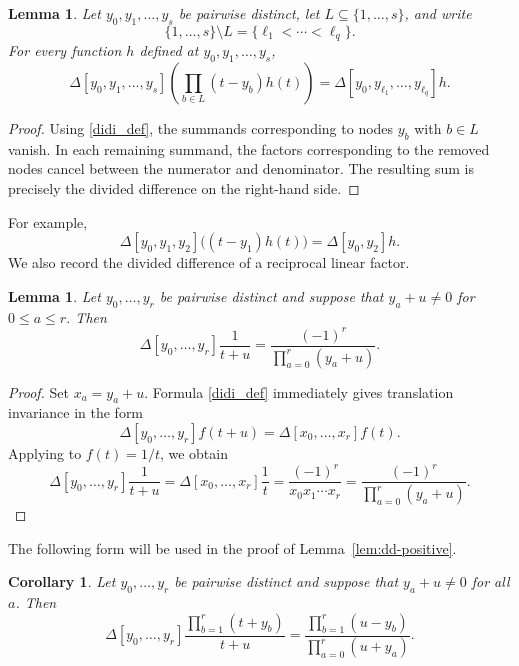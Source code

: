 \documentclass[10pt,a4paper]{amsart}
\newtheorem{Lemma}[Theorem]{Lemma}
\newtheorem{Corollary}[Theorem]{Corollary}
\theoremstyle{definition}
\newcommand{\DD}{\Delta}
\begin{document}
\begin{Lemma}\label{lem:node-removal}
Let $y_0,y_1,\ldots,y_s$ be pairwise distinct, let
$L\subseteq\{1,\ldots,s\}$, and write
\[
\{1,\ldots,s\}\setminus L=\{\ell_1<\cdots<\ell_q\}.
\]
For every function $h$ defined at $y_0,y_1,\ldots,y_s$,
\[
\DD[y_0,y_1,\ldots,y_s]
\left(
\prod_{b\in L}(t-y_b)h(t)
\right)
=
\DD[y_0,y_{\ell_1},\ldots,y_{\ell_q}]h.
\]
\end{Lemma}

\begin{proof}
Using \eqref{didi_def}, the summands corresponding to nodes $y_b$
with $b\in L$ vanish.
In each remaining summand, the factors corresponding to the removed
nodes cancel between the numerator and denominator.
The resulting sum is precisely the divided difference on the
right-hand side.
\end{proof}

For example,
\[
\DD[y_0,y_1,y_2]\bigl((t-y_1)h(t)\bigr)
=
\DD[y_0,y_2]h.
\]
We also record the divided difference of a reciprocal linear factor.

\begin{Lemma}\label{lem:reciprocal-dd}
Let $y_0,\ldots,y_r$ be pairwise distinct and suppose that
$y_a+u\ne0$ for $0\le a\le r$.  Then
\begin{equation}\label{t+u}
\DD[y_0,\ldots,y_r]\frac1{t+u}
=
\frac{(-1)^r}{\prod_{a=0}^r(y_a+u)}.
\end{equation}
\end{Lemma}

\begin{proof}
Set $x_a=y_a+u$.  Formula \eqref{didi_def} immediately gives translation invariance in
the form
\[
\DD[y_0,\ldots,y_r]f(t+u)
=
\DD[x_0,\ldots,x_r]f(t).
\]
Applying \cite[Theorem~13]{DubeauHermite} to $f(t)=1/t$, we obtain
\[
\DD[y_0,\ldots,y_r]\frac1{t+u}
=
\DD[x_0,\ldots,x_r]\frac1t
=
\frac{(-1)^r}{x_0x_1\cdots x_r}
=
\frac{(-1)^r}{\prod_{a=0}^r(y_a+u)}.
\]
\end{proof}

The following form will be used in the proof of Lemma~\ref{lem:dd-positive}.

\begin{Corollary}\label{cor:rational-dd}
Let $y_0,\ldots,y_r$ be pairwise distinct and suppose that $y_a+u\ne0$
for all $a$.  Then
\[
\DD[y_0,\ldots,y_r]
\frac{\prod_{b=1}^r(t+y_b)}{t+u}
=
\frac{\prod_{b=1}^r(u-y_b)}{\prod_{a=0}^r(u+y_a)}.
\]
\end{Corollary}
\end{document}
